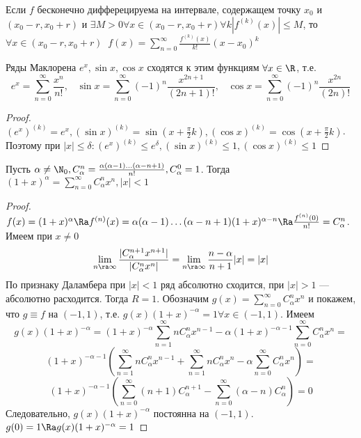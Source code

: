 
\begin{corollary}
    Если \(f\) бесконечно дифферецируема на интервале, содержащем точку \(x_0\) и \((x_0 - r, x_0 + r)\) и  \(\exists M > 0 \forall x \in (x_0 - r, x_0 + r) \forall k |f^{(k)}(x)| \le M\), то \(\forall x \in (x_0 - r, x_0 + r)\;\;f(x) = \sum_{n = 0}^\infty \frac{f^{(k)}(x)}{k!}(x - x_0)^k\)
\end{corollary}

\begin{corollary}
    Ряды Маклорена \(e^x, \sin x, \cos x\) сходятся к этим функциям \(\forall x \in \R\), т.е. 
    \[e^x = \sum_{n = 0}^\infty \frac{x^n}{n!},\;\;\;\sin x = \sum_{n = 0}^\infty (-1)^n\frac{x^{2n + 1}}{(2n+1)!},\;\;\;\cos x = \sum_{n = 0}^\infty (-1)^n\frac{x^{2n}}{(2n)!}\]
\end{corollary}
\begin{proof}
    \((e^x)^{(k)} = e^x, (\sin x)^{(k)} = \sin\left(x + \frac{\pi}{2}k\right), (\cos x)^{(k)} = \cos\left(x + \frac{\pi}{2}k\right)\). Поэтому при \(|x| \le \delta: (e^x)^{(k)} \le e^\delta, (\sin x)^{(k)} \le 1, (\cos x)^{(k)} \le 1\)
\end{proof}


\begin{theorem}
    Пусть \(\alpha \ne \N_0, C_\alpha^n = \frac{\alpha(\alpha - 1)\dots(\alpha - n + 1)}{n!}, C_\alpha^0 = 1\). Тогда \((1 + x)^\alpha = \sum_{n = 0}^\infty C_\alpha^nx^n, |x| < 1\)
\end{theorem}
\begin{proof}
    \(f(x) = (1 + x)^\alpha \Ra f^{(n)}(x) = \alpha(\alpha - 1)\dots(\alpha - n + 1)(1 + x)^{\alpha - n} \Ra \frac{f^{(n)}(0)}{n!} = C_\alpha^n\). Имеем при \(x \ne 0\)
    \[\lim_{n \ra \infty}\frac{|C_\alpha^{n + 1}x^{n + 1}|}{|C_\alpha^nx^n|} = \lim_{n \ra \infty} \frac{n - \alpha}{n + 1}|x| = |x|\]
    По признаку Даламбера при \(|x| < 1\) ряд абсолютно сходится, при \(|x| > 1\) --- абсолютно расходится. Тогда \(R = 1\). Обозначим \(g(x) = \sum_{n = 0}^\infty C_\alpha^nx^n\) и покажем, что \(g \equiv f\) на \((-1, 1)\), т.е. \(g(x)(1 + x)^{-\alpha} = 1 \forall x \in (-1, 1)\). Имеем 
    \[g(x)(1 + x)^{-\alpha} = (1 + x)^{-\alpha}\sum_{n = 1}^\infty nC_\alpha^nx^{n - 1} - \alpha(1 + x)^{-\alpha - 1}\sum_{n = 0}^\infty C_\alpha^nx^n =\]
    \[ (1 + x)^{-\alpha - 1}\left(\sum_{n = 1}^\infty nC_\alpha^nx^{n - 1} + \sum_{n = 1}^\infty nC_\alpha^nx^n - \alpha\sum_{n = 0}^\infty C_\alpha^nx^n\right) = \]
    \[(1 + x)^{-\alpha - 1}\left(\sum_{n = 0}^\infty (n + 1)C_\alpha^{n + 1} - \sum_{n = 0}^\infty (\alpha - n)C_\alpha^n \right) = 0\]
    Следовательно, \(g(x)(1 + x)^{-\alpha}\) постоянна на \((-1, 1)\). \(g(0) = 1 \Ra g(x)(1 + x)^{-\alpha} = 1\)
\end{proof}

